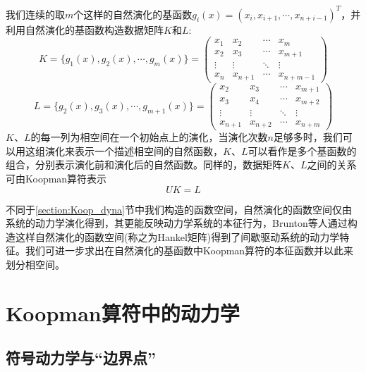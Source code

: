 我们连续的取$m$个这样的自然演化的基函数$g_i(x)=(x_i,x_{i+1},\cdots,x_{n+i-1})^T$，并利用自然演化的基函数构造数据矩阵$K$和$L$:
\begin{equation}
    K=\{g_1(x),g_2(x),\cdots,g_m(x)\}=
    \begin{pmatrix}
        x_1 & x_2 & \cdots & x_m \\
        x_2 & x_3 & \cdots & x_{m+1} \\
        \vdots         & \vdots         & \ddots & \vdots \\
        x_n & x_{n+1} & \cdots & x_{n+m-1}
    \end{pmatrix}
\end{equation}
\begin{equation}
    L=\{g_2(x),g_3(x),\cdots,g_{m+1}(x)\}=
    \begin{pmatrix}
        x_2 & x_3 & \cdots & x_{m+1} \\
        x_3 & x_4 & \cdots & x_{m+2} \\
        \vdots         & \vdots         & \ddots & \vdots \\
        x_{n+1} & x_{n+2} & \cdots & x_{n+m}
    \end{pmatrix}
\end{equation}
$K$、$L$的每一列为相空间在一个初始点上的演化，当演化次数$n$足够多时，我们可以用这组演化来表示一个描述相空间的自然函数，$K$、$L$可以看作是多个基函数的组合，分别表示演化前和演化后的自然函数。同样的，数据矩阵$K$、$L$之间的关系可由Koopman算符表示
\begin{equation}
    UK=L
    \label{eq:Koop_kl2}
\end{equation}

不同于\ref{section:Koop_dyna}节中我们构造的函数空间，自然演化的函数空间仅由系统的动力学演化得到，其更能反映动力学系统的本征行为，Brunton等人通过构造这样自然演化的函数空间(称之为Hankel矩阵)得到了间歇驱动系统的动力学特征\cite{brunton2017chaos}。我们可进一步求出在自然演化的基函数中Koopman算符的本征函数并以此来划分相空间。

\section{Koopman算符中的动力学}

\subsection{符号动力学与“边界点”}


